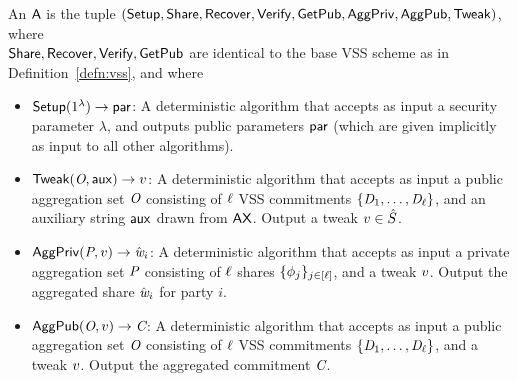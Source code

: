 \begin{definition} \label{defn:avss}
  An  $\mathsf{A}$ is the tuple
  $(\mathsf{Setup}, \mathsf{Share}, \mathsf{Recover}, \mathsf{Verify}, \mathsf{GetPub}, \mathsf{AggPriv}, \mathsf{AggPub}, \mathsf{Tweak})$,
   where \\ $\mathsf{Share},\mathsf{Recover},\mathsf{Verify},\mathsf{GetPub}$ are identical to the base VSS scheme as in Definition~\ref{defn:vss},
   and where
  \begin{itemize}
  \item $\mathsf{Setup}(1^{\lambda}) \rightarrow \mathsf{par}$:
    A deterministic algorithm that accepts as input a security parameter $\lambda$,
    and outputs public parameters $\mathsf{par}$ (which are given implicitly as input to all other algorithms).

    \item $\mathsf{Tweak}(\textit{O}, \mathsf{aux}) \rightarrow v$:
      A deterministic algorithm that accepts as input
      a public aggregation set $\textit{O}$ consisting of $\mathsf{\ell}$ VSS commitments $\{ \textit{D}_1, \ldots, \textit{D}_{\mathsf{\ell}} \}$,
      and an auxiliary string $\mathsf{aux}$ drawn from $\mathsf{AX}$.
      Output a tweak $v \in \hat{S}$.

    \item $\mathsf{AggPriv}(\textit{P}, v) \rightarrow \hat{\textit{w}}_i$:
      A deterministic algorithm that accepts as input
      a private aggregation set $\textit{P} $ consisting of $\mathsf{\ell}$ shares $ \{ \phi_{j} \}_{j \in [\mathsf{\ell}]}$,
      and a tweak $v$.
      Output the aggregated share $\hat{\textit{w}}_i$ for party $i$.

    \item $\mathsf{AggPub}(\textit{O}, v) \rightarrow \textit{C}$:
      A deterministic algorithm that accepts as input
      a public aggregation set $\textit{O}$ consisting of $\mathsf{\ell}$ VSS commitments $\{ \textit{D}_1, \ldots, \textit{D}_{\mathsf{\ell}} \}$,
      and a tweak $v$.
      Output the aggregated commitment $\textit{C}$.
  \end{itemize}
\end{definition}

